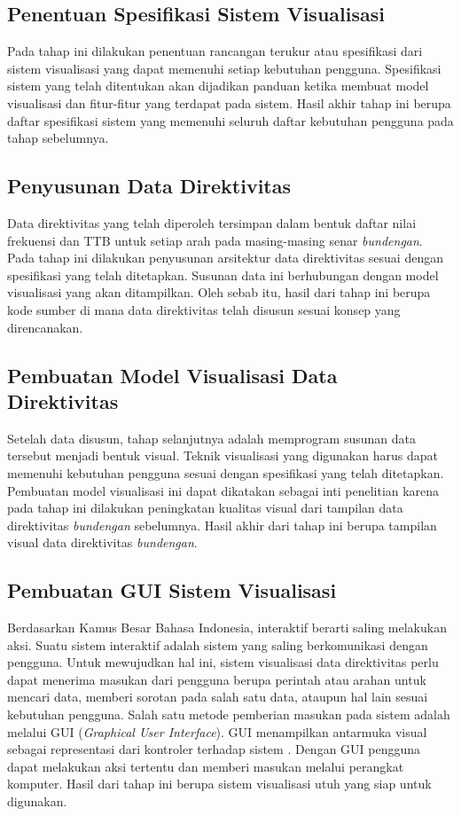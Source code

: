 \subsection{Penentuan Spesifikasi Sistem Visualisasi}
Pada tahap ini dilakukan penentuan rancangan terukur atau spesifikasi dari sistem visualisasi yang dapat memenuhi setiap kebutuhan pengguna. Spesifikasi sistem yang telah ditentukan akan dijadikan panduan ketika membuat model visualisasi dan fitur-fitur yang terdapat pada sistem. Hasil akhir tahap ini berupa daftar spesifikasi sistem yang memenuhi seluruh daftar kebutuhan pengguna pada tahap sebelumnya. \par 
\subsection{Penyusunan Data Direktivitas \Bundengan}
Data direktivitas yang telah diperoleh tersimpan dalam bentuk daftar nilai frekuensi dan TTB untuk setiap arah pada masing-masing senar \textit{bundengan}. Pada tahap ini dilakukan penyusunan arsitektur data direktivitas \bundengan sesuai dengan spesifikasi yang telah ditetapkan. Susunan data ini berhubungan dengan model visualisasi yang akan ditampilkan. Oleh sebab itu, hasil dari tahap ini berupa kode sumber di mana data direktivitas telah disusun sesuai konsep yang direncanakan. \par 
\subsection{Pembuatan Model Visualisasi Data Direktivitas \Bundengan}
Setelah data disusun, tahap selanjutnya adalah memprogram susunan data tersebut menjadi bentuk visual. Teknik visualisasi yang digunakan harus dapat memenuhi kebutuhan pengguna sesuai dengan spesifikasi yang telah ditetapkan. Pembuatan model visualisasi ini dapat dikatakan sebagai inti penelitian karena pada tahap ini dilakukan peningkatan kualitas visual dari tampilan data direktivitas \textit{bundengan} sebelumnya. Hasil akhir dari tahap ini berupa tampilan visual data direktivitas \textit{bundengan}. \par 
\subsection{Pembuatan GUI Sistem Visualisasi}
Berdasarkan Kamus Besar Bahasa Indonesia, interaktif berarti saling melakukan aksi. Suatu sistem interaktif adalah sistem yang saling berkomunikasi dengan pengguna. Untuk mewujudkan hal ini, sistem visualisasi data direktivitas \bundengan perlu dapat menerima masukan dari pengguna berupa perintah atau arahan untuk mencari data, memberi sorotan pada salah satu data, ataupun hal lain sesuai kebutuhan pengguna. Salah satu metode pemberian masukan pada sistem adalah melalui GUI (\textit{Graphical User Interface}). GUI menampilkan antarmuka visual sebagai representasi dari kontroler terhadap sistem \cite{GUI-sumber}. Dengan GUI pengguna dapat melakukan aksi tertentu dan memberi masukan melalui perangkat komputer. Hasil dari tahap ini berupa sistem visualisasi utuh yang siap untuk digunakan. \par 
